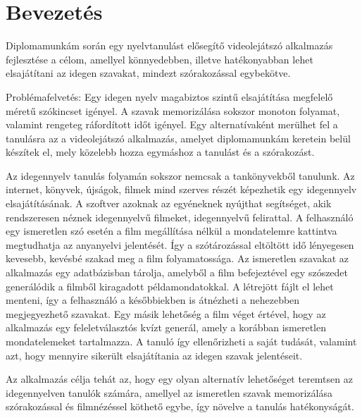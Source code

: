 \chapter*{Bevezetés}

Diplomamunkám során egy nyelvtanulást elősegítő videolejátszó  alkalmazás fejlesztése a célom, amellyel könnyedebben, illetve hatékonyabban lehet elsajátítani az idegen szavakat, mindezt szórakozással egybekötve.

Problémafelvetés: Egy idegen nyelv magabiztos szintű elsajátítása megfelelő méretű szókincset igényel. A szavak memorizálása sokszor monoton folyamat, valamint rengeteg ráfordított időt igényel. Egy alternatívaként merülhet fel a tanulásra az a videolejátszó alkalmazás, amelyet diplomamunkám keretein belül készítek el, mely közelebb hozza egymáshoz a tanulást és a szórakozást.

Az idegennyelv tanulás folyamán sokszor nemcsak a tankönyvekből tanulunk. Az internet, könyvek, újságok, filmek mind szerves részét képezhetik egy idegennyelv elsajátításának. A szoftver azoknak az egyéneknek nyújthat segítséget, akik rendszeresen néznek idegennyelvű filmeket, idegennyelvű felirattal. A felhasználó egy ismeretlen szó esetén a film megállítása nélkül a mondatelemre kattintva megtudhatja az anyanyelvi jelentését. Így a szótározással eltöltött idő lényegesen kevesebb, kevésbé szakad meg a film folyamatossága.
Az ismeretlen szavakat az alkalmazás egy adatbázisban tárolja, amelyből a film befejeztével egy szószedet generálódik a filmből kiragadott példamondatokkal. A létrejött fájlt el lehet menteni, így a felhasználó a későbbiekben is átnézheti a nehezebben megjegyezhető szavakat.
Egy másik lehetőség a film véget értével, hogy az alkalmazás egy feleletválasztós kvízt generál, amely a korábban ismeretlen mondatelemeket tartalmazza. A tanuló így ellenőrizheti a saját tudását, valamint azt, hogy mennyire sikerült elsajátítania az idegen szavak jelentéseit.

Az alkalmazás célja tehát az, hogy egy olyan alternatív lehetőséget teremtsen az idegennyelven tanulók számára, amellyel az ismeretlen szavak memorizálása szórakozással és filmnézéssel köthető egybe, így növelve a tanulás hatékonyságát.

